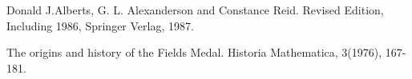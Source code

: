 \bigskip
\bigskip


\Ref

  {Donald J.Alberts, G. L. Alexanderson and Constance
  Reid.}  {Revised Edition, Including 1986, Springer Verlag, 1987.}

  {The origins and history of the Fields
  Medal.}  {Historia Mathematica,} {3(1976), 167-181.}
